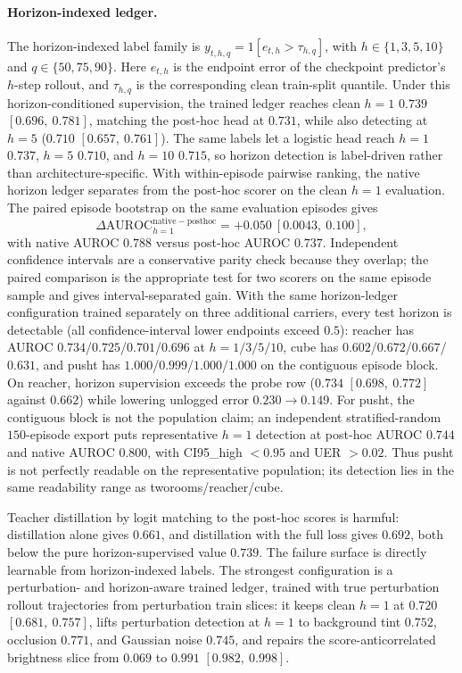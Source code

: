 \paragraph{Horizon-indexed ledger.}
The horizon-indexed label family is
$y_{t,h,q} = 1[e_{t,h} > \tau_{h,q}]$, with
$h \in \{1,3,5,10\}$ and $q \in \{50,75,90\}$.  Here $e_{t,h}$ is the
endpoint error of the checkpoint predictor's $h$-step rollout, and
$\tau_{h,q}$ is the corresponding clean train-split quantile.  Under this
horizon-conditioned supervision, the trained ledger reaches clean $h=1$
$0.739$ $[0.696,\ 0.781]$, matching the post-hoc head at $0.731$, while also
detecting at $h=5$ ($0.710$ $[0.657,\ 0.761]$).  The same labels let a
logistic head reach $h=1$ $0.737$, $h=5$ $0.710$, and $h=10$ $0.715$, so
horizon detection is label-driven rather than architecture-specific.  With
within-episode pairwise ranking, the native horizon ledger separates from the
post-hoc scorer on the clean $h=1$ evaluation.  The paired episode bootstrap on
the same evaluation episodes gives
$$
\Delta\mathrm{AUROC}_{h=1}^{\mathrm{native-posthoc}}
= +0.050\ [0.0043,\ 0.100],
$$
with native AUROC $0.788$ versus post-hoc AUROC $0.737$.  Independent
confidence intervals are a conservative parity check because they overlap; the
paired comparison is the appropriate test for two scorers on the same episode
sample and gives interval-separated gain.
With the same horizon-ledger configuration trained separately on three
additional carriers, every test horizon is detectable (all confidence-interval
lower endpoints exceed $0.5$): reacher has AUROC $0.734$/$0.725$/$0.701$/$0.696$
at $h=1/3/5/10$, cube has $0.602$/$0.672$/$0.667$/$0.631$, and pusht has
$1.000$/$0.999$/$1.000$/$1.000$ on the contiguous episode block.  On reacher,
horizon supervision exceeds the probe row ($0.734$ $[0.698,\ 0.772]$ against
$0.662$) while lowering unlogged error $0.230 \rightarrow 0.149$.  For pusht,
the contiguous block is not the population claim; an independent
stratified-random $150$-episode export puts representative $h=1$ detection at
post-hoc AUROC $0.744$ and native AUROC $0.800$, with CI95\_high $<0.95$ and
UER $>0.02$.  Thus pusht is not perfectly readable on the representative
population; its detection lies in the same readability range as
tworooms/reacher/cube.

Teacher distillation by logit matching to the post-hoc scores is harmful:
distillation alone gives $0.661$, and distillation with the full loss gives
$0.692$, both below the pure horizon-supervised value $0.739$.  The failure
surface is directly learnable from horizon-indexed labels.  The strongest
configuration is a perturbation- and horizon-aware trained ledger, trained
with true perturbation rollout trajectories from perturbation train slices: it
keeps clean $h=1$ at $0.720$ $[0.681,\ 0.757]$, lifts perturbation detection
at $h=1$ to background tint $0.752$, occlusion $0.771$, and Gaussian noise
$0.745$, and repairs the score-anticorrelated brightness slice from $0.069$ to
$0.991$ $[0.982,\ 0.998]$.


